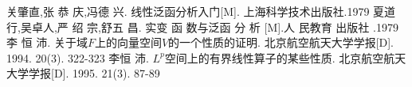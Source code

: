 \documentclass[12pt,a4paper,UTF8]{ctexart}
\begin{document}
\newpage %
{} %

\begin{thebibliography}{99}


关肇直,张 恭 庆,冯德 兴.  线性泛函分析入门[M].  上海科学技术出版社.1979
夏道行,吴卓人,严 绍 宗,舒五 昌.  实变 函 数与泛函 分 析 [M].人 民教育 出版社 .1979
李 恒 沛.  关于域$F$上的向量空间$V$的一个性质的证明.  北京航空航天大学学报[D].   1994. 20(3). 322-323
李恒 沛.  $L^p$空间上的有界线性算子的某些性质.  北京航空航天大学学报[D].  1995. 21(3). 87-89  


\end{thebibliography}
\end{document}
